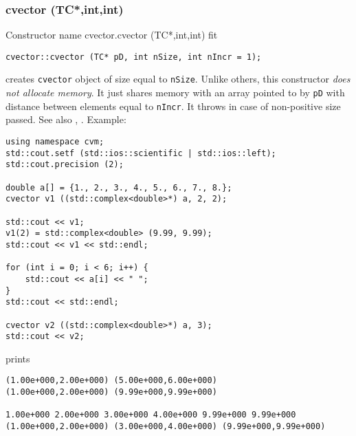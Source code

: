 \subsubsection{cvector (TC*,int,int)}
Constructor%
\pdfdest name {cvector.cvector (TC*,int,int)} fit
\begin{verbatim}
cvector::cvector (TC* pD, int nSize, int nIncr = 1);
\end{verbatim}
creates  \verb"cvector" object of size equal to \verb"nSize".
Unlike others, this constructor \textit{does not allocate memory}.
It just shares memory with an array pointed to by \verb"pD" with
 distance between elements equal to \verb"nIncr".
It throws  
in case of non-positive size passed.
See also , .
Example:
\begin{Verbatim}
using namespace cvm;
std::cout.setf (std::ios::scientific | std::ios::left);
std::cout.precision (2);

double a[] = {1., 2., 3., 4., 5., 6., 7., 8.};
cvector v1 ((std::complex<double>*) a, 2, 2);

std::cout << v1;
v1(2) = std::complex<double> (9.99, 9.99);
std::cout << v1 << std::endl;

for (int i = 0; i < 6; i++) {
    std::cout << a[i] << " ";
}
std::cout << std::endl;

cvector v2 ((std::complex<double>*) a, 3);
std::cout << v2;
\end{Verbatim}
prints
\begin{Verbatim}
(1.00e+000,2.00e+000) (5.00e+000,6.00e+000)
(1.00e+000,2.00e+000) (9.99e+000,9.99e+000)

1.00e+000 2.00e+000 3.00e+000 4.00e+000 9.99e+000 9.99e+000
(1.00e+000,2.00e+000) (3.00e+000,4.00e+000) (9.99e+000,9.99e+000)
\end{Verbatim}
\newpage



